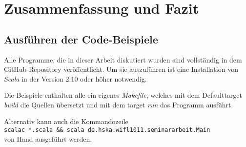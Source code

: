 \section{Zusammenfassung und Fazit}

\subsection{Ausführen der Code-Beispiele}

Alle Programme, die in dieser Arbeit diskutiert wurden sind 
vollständig in dem GitHub-Repository \cite{code} veröffentlicht.
Um sie auszuführen ist eine Installation von \emph{Scala} in der
Version 2.10 oder höher notwendig.

Die Beispiele enthalten alle ein eigenes \emph{Makefile}, welches
mit dem Defaulttarget \emph{build} die Quellen übersetzt und mit
dem target \emph{run} das Programm ausführt.

Alternativ kann auch die Kommandozeile \\
\texttt{scalac *.scala \&\& scala de.hska.wifl1011.seminararbeit.Main} \\
von Hand ausgeführt werden.
